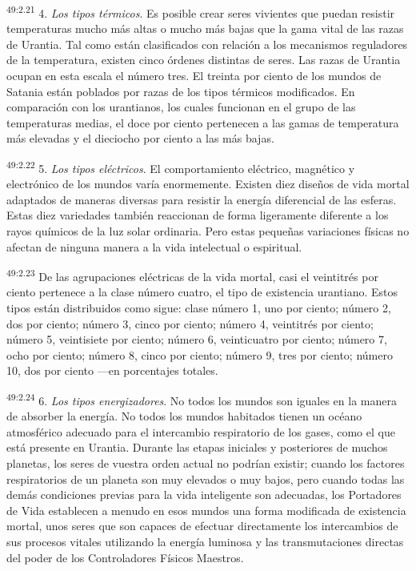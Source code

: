 \par
\textsuperscript{49:2.21} 4. \textit{Los tipos térmicos}. Es posible crear seres vivientes que puedan resistir temperaturas mucho más altas o mucho más bajas que la gama vital de las razas de Urantia. Tal como están clasificados con relación a los mecanismos reguladores de la temperatura, existen cinco órdenes distintas de seres. Las razas de Urantia ocupan en esta escala el número tres. El treinta por ciento de los mundos de Satania están poblados por razas de los tipos térmicos modificados. En comparación con los urantianos, los cuales funcionan en el grupo de las temperaturas medias, el doce por ciento pertenecen a las gamas de temperatura más elevadas y el dieciocho por ciento a las más bajas.

\par
\textsuperscript{49:2.22} 5. \textit{Los tipos eléctricos}. El comportamiento eléctrico, magnético y electrónico de los mundos varía enormemente. Existen diez diseños de vida mortal adaptados de maneras diversas para resistir la energía diferencial de las esferas. Estas diez variedades también reaccionan de forma ligeramente diferente a los rayos químicos de la luz solar ordinaria. Pero estas pequeñas variaciones físicas no afectan de ninguna manera a la vida intelectual o espiritual.

\par
\textsuperscript{49:2.23} De las agrupaciones eléctricas de la vida mortal, casi el veintitrés por ciento pertenece a la clase número cuatro, el tipo de existencia urantiano. Estos tipos están distribuidos como sigue: clase número 1, uno por ciento; número 2, dos por ciento; número 3, cinco por ciento; número 4, veintitrés por ciento; número 5, veintisiete por ciento; número 6, veinticuatro por ciento; número 7, ocho por ciento; número 8, cinco por ciento; número 9, tres por ciento; número 10, dos por ciento ---en porcentajes totales.

\par
\textsuperscript{49:2.24} 6. \textit{Los tipos energizadores}. No todos los mundos son iguales en la manera de absorber la energía. No todos los mundos habitados tienen un océano atmosférico adecuado para el intercambio respiratorio de los gases, como el que está presente en Urantia. Durante las etapas iniciales y posteriores de muchos planetas, los seres de vuestra orden actual no podrían existir; cuando los factores respiratorios de un planeta son muy elevados o muy bajos, pero cuando todas las demás condiciones previas para la vida inteligente son adecuadas, los Portadores de Vida establecen a menudo en esos mundos una forma modificada de existencia mortal, unos seres que son capaces de efectuar directamente los intercambios de sus procesos vitales utilizando la energía luminosa y las transmutaciones directas del poder de los Controladores Físicos Maestros.

